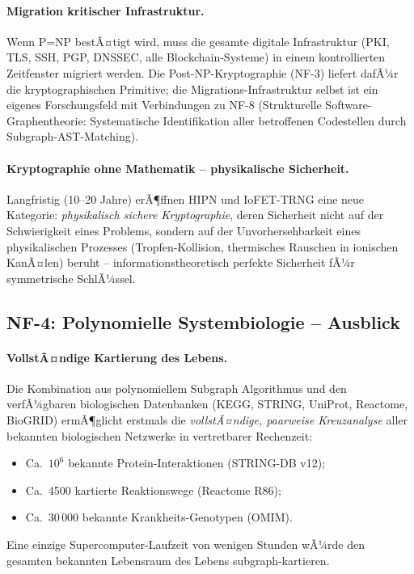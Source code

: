 ﻿\documentclass[a4paper,12pt]{scrreprt}
\theoremstyle{definition}
\begin{document}
\paragraph{Migration kritischer Infrastruktur.}
Wenn P=NP bestÃ¤tigt wird, muss die gesamte digitale Infrastruktur
(PKI, TLS, SSH, PGP, DNSSEC, alle Blockchain-Systeme) in einem
kontrollierten Zeitfenster migriert werden. Die Post-NP-Kryptographie
(NF-3) liefert dafÃ¼r die kryptographischen Primitive; die
Migrations-Infrastruktur selbst ist ein eigenes Forschungsfeld
mit Verbindungen zu NF-8 (Strukturelle Software-Graphentheorie:
Systematische Identifikation aller betroffenen Codestellen durch
Subgraph-AST-Matching).

\paragraph{Kryptographie ohne Mathematik -- physikalische Sicherheit.}
Langfristig (10--20 Jahre) erÃ¶ffnen HIPN und IoFET-TRNG eine neue
Kategorie: \emph{physikalisch sichere Kryptographie}, deren Sicherheit
nicht auf der Schwierigkeit eines Problems, sondern auf der
Unvorhersehbarkeit eines physikalischen Prozesses (Tropfen-Kollision,
thermisches Rauschen in ionischen KanÃ¤len) beruht -- informationstheoretisch
perfekte Sicherheit fÃ¼r symmetrische SchlÃ¼ssel.

\subsection*{NF-4: Polynomielle Systembiologie -- Ausblick}

\paragraph{VollstÃ¤ndige Kartierung des Lebens.}
Die Kombination aus polynomiellem Subgraph Algorithmus und den
verfÃ¼gbaren biologischen Datenbanken (KEGG, STRING, UniProt,
Reactome, BioGRID) ermÃ¶glicht erstmals die \emph{vollstÃ¤ndige,
paarweise Kreuzanalyse} aller bekannten biologischen Netzwerke
in vertretbarer Rechenzeit:
\begin{itemize}
  \item Ca.\ $10^6$ bekannte Protein-Interaktionen (STRING-DB v12);
  \item Ca.\ 4500 kartierte Reaktionswege (Reactome R86);
  \item Ca.\ $30\,000$ bekannte Krankheits-Genotypen (OMIM).
\end{itemize}
Eine einzige Supercomputer-Laufzeit von wenigen Stunden wÃ¼rde
den gesamten bekannten Lebensraum des Lebens subgraph-kartieren.
\end{document}
